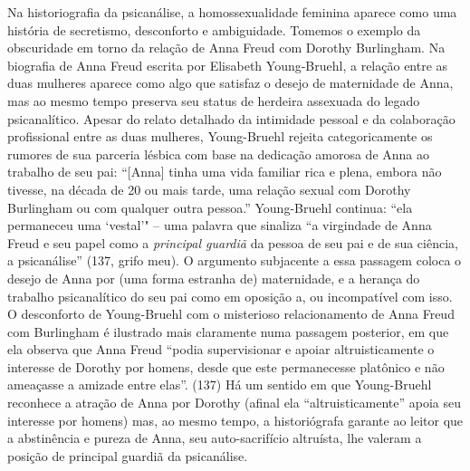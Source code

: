 Na historiografia da psicanálise, a homossexualidade feminina aparece
como uma história de secretismo, desconforto e ambiguidade. Tomemos o
exemplo da obscuridade em torno da relação de Anna Freud com Dorothy
Burlingham. Na biografia de Anna Freud escrita por Elisabeth
Young-Bruehl, a relação entre as duas mulheres aparece como algo que
satisfaz o desejo de maternidade de Anna, mas ao mesmo tempo preserva
seu status de herdeira assexuada do legado psicanalítico. Apesar do
relato detalhado da intimidade pessoal e da colaboração profissional
entre as duas mulheres, Young-Bruehl rejeita categoricamente os rumores
de sua parceria lésbica com base na dedicação amorosa de Anna ao
trabalho de seu pai: ``{[}Anna{]} tinha uma vida familiar rica e plena,
embora não tivesse, na década de 20 ou mais tarde, uma relação sexual
com Dorothy Burlingham ou com qualquer outra pessoa.'' Young-Bruehl
continua: ``ela permaneceu uma `vestal'" -- uma palavra que sinaliza
``a virgindade de Anna Freud e seu papel como a \emph{principal guardiã}
da pessoa de seu pai e de sua ciência, a psicanálise'' (137, grifo meu).
O argumento subjacente a essa passagem coloca o desejo de Anna por (uma
forma estranha de) maternidade, e a herança do trabalho psicanalítico do
seu pai como em oposição a, ou incompatível com isso. O desconforto de
Young-Bruehl com o misterioso relacionamento de Anna Freud com
Burlingham é ilustrado mais claramente numa passagem posterior, em que
ela observa que Anna Freud ``podia supervisionar e apoiar
altruisticamente o interesse de Dorothy por homens, desde que este
permanecesse platônico e não ameaçasse a amizade entre elas''. (137) Há
um sentido em que Young-Bruehl reconhece a atração de Anna por Dorothy
(afinal ela ``altruisticamente'' apoia seu interesse por homens) mas, ao
mesmo tempo, a historiógrafa garante ao leitor que a abstinência e
pureza de Anna, seu auto-sacrifício altruísta, lhe valeram a posição de
principal guardiã da psicanálise.

